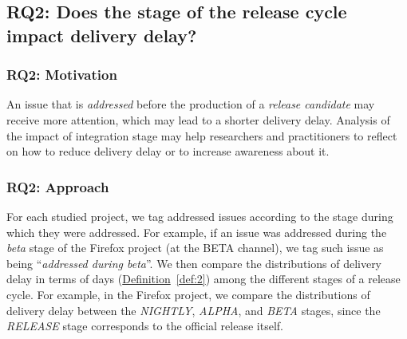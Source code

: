 \DIFdelbegin %
\DIFdelend \DIFaddbegin {}
\DIFaddend 


\subsection{RQ2: Does the stage of the release cycle impact
delivery delay?}\label{ch4:rq2}

\subsubsection*{RQ2: Motivation}

An issue that is {\em addressed} before the production of a {\em release candidate}
may receive more attention, which may lead to a shorter delivery delay.
Analysis of the impact of integration stage may help researchers and
practitioners to reflect on how to reduce delivery delay or to increase
awareness about it.

\subsubsection*{RQ2: Approach} 

For each studied project, we tag addressed issues according to the stage during
which they were addressed. For example, if an issue was addressed during the {\em beta}
stage of the Firefox project (\ie at the BETA channel), we tag such issue as
being ``{\em addressed during beta}''. We then compare the distributions of
delivery delay in terms of days (\hyperref[def:2]{Definition}~\ref{def:2})
among the different stages of a release cycle. For example, in the Firefox
project, we compare the distributions of delivery delay between the {\em
NIGHTLY}, {\em ALPHA}, and {\em BETA} stages, since the {\em RELEASE} stage
corresponds to the official release itself.

